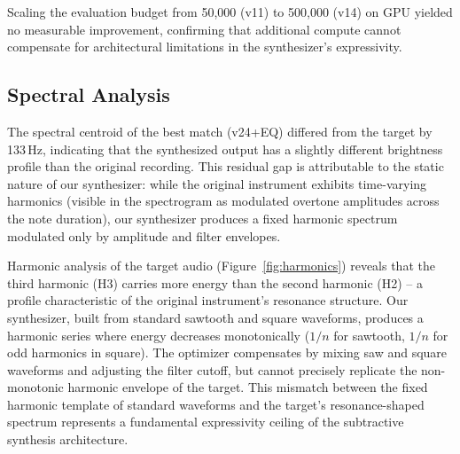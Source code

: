 Scaling the evaluation budget from 50{,}000 (v11) to 500{,}000 (v14) on GPU yielded no measurable improvement, confirming that additional compute cannot compensate for architectural limitations in the synthesizer's expressivity.

\subsection{Spectral Analysis}

The spectral centroid of the best match (v24+EQ) differed from the target by 133\,Hz, indicating that the synthesized output has a slightly different brightness profile than the original recording.
This residual gap is attributable to the static nature of our synthesizer: while the original instrument exhibits time-varying harmonics (visible in the spectrogram as modulated overtone amplitudes across the note duration), our synthesizer produces a fixed harmonic spectrum modulated only by amplitude and filter envelopes.

Harmonic analysis of the target audio (Figure~\ref{fig:harmonics}) reveals that the third harmonic (H3) carries more energy than the second harmonic (H2) -- a profile characteristic of the original instrument's resonance structure.
Our synthesizer, built from standard sawtooth and square waveforms, produces a harmonic series where energy decreases monotonically ($1/n$ for sawtooth, $1/n$ for odd harmonics in square).
The optimizer compensates by mixing saw and square waveforms and adjusting the filter cutoff, but cannot precisely replicate the non-monotonic harmonic envelope of the target.
This mismatch between the fixed harmonic template of standard waveforms and the target's resonance-shaped spectrum represents a fundamental expressivity ceiling of the subtractive synthesis architecture.
